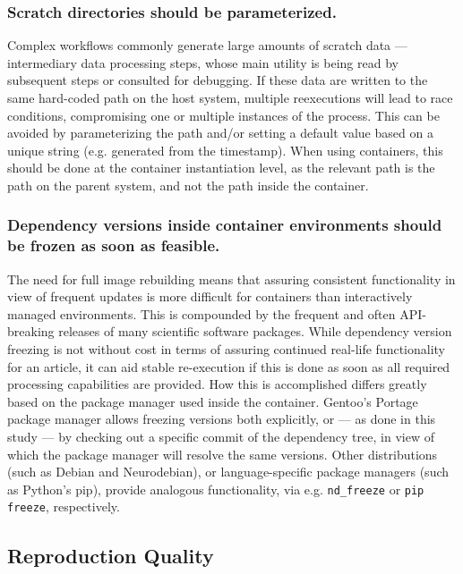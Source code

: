 \subsubsection{Scratch directories should be parameterized.}
Complex workflows commonly generate large amounts of scratch data — intermediary data processing steps, whose main utility is being read by subsequent steps or consulted for debugging.
If these data are written to the same hard-coded path on the host system, multiple reexecutions will lead to race conditions, compromising one or multiple instances of the process.
This can be avoided by parameterizing the path and/or setting a default value based on a unique string (e.g. generated from the timestamp).
When using containers, this should be done at the container instantiation level, as the relevant path is the path on the parent system, and not the path inside the container.

\subsubsection{Dependency versions inside container environments should be frozen as soon as feasible.}
The need for full image rebuilding means that assuring consistent functionality in view of frequent updates is more difficult for containers than interactively managed environments.
This is compounded by the frequent and often API-breaking releases of many scientific software packages.
While dependency version freezing is not without cost in terms of assuring continued real-life functionality for an article, it can aid stable re-execution if this is done as soon as all required processing capabilities are provided.
How this is accomplished differs greatly based on the package manager used inside the container.
Gentoo's Portage package manager allows freezing versions both explicitly, or — as done in this study — by checking out a specific commit of the dependency tree, in view of which the package manager will resolve the same versions.
Other distributions (such as Debian and Neurodebian), or language-specific package managers (such as Python's pip), provide analogous functionality, via e.g. \texttt{nd\_freeze} or \texttt{pip freeze}, respectively.


\subsection{Reproduction Quality}


